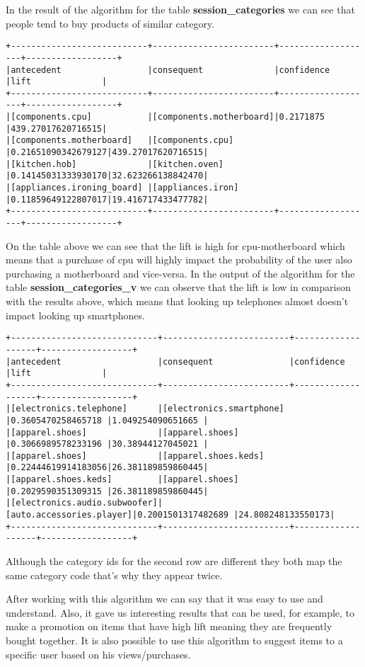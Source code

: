 In the result of the algorithm for the table \textbf{session\_categories} we can see that people tend to buy
products of similar category.

\begin{Verbatim}[commandchars=\\\{\}]
+---------------------------+------------------------+-------------------+------------------+
|antecedent                 |consequent              |confidence         |lift              |
+---------------------------+------------------------+-------------------+------------------+
|[components.cpu]           |[components.motherboard]|0.2171875          |439.27017620716515|
|[components.motherboard]   |[components.cpu]        |0.21651090342679127|439.27017620716515|
|[kitchen.hob]              |[kitchen.oven]          |0.14145031333930170|32.623266138842470|
|[appliances.ironing_board] |[appliances.iron]       |0.11859649122807017|19.416717433477782|
+---------------------------+------------------------+-------------------+------------------+
\end{Verbatim}

On the table above we can see that the lift is high for cpu-motherboard which means that a purchase of cpu will highly impact the probability of the user also purchasing a
motherboard and vice-versa.
In the output of the algorithm for the table \textbf{session\_categories\_v} we can observe that the lift is low in comparison with the results above,
which means that looking up telephones almost doesn't impact looking up smartphones.

\begin{Verbatim}[commandchars=\\\{\}]
+-----------------------------+-------------------------+-------------------+------------------+
|antecedent                   |consequent               |confidence         |lift              |
+-----------------------------+-------------------------+-------------------+------------------+
|[electronics.telephone]      |[electronics.smartphone] |0.3605470258465718 |1.049254090651665 |
|[apparel.shoes]              |[apparel.shoes]          |0.3066989578233196 |30.38944127045021 |
|[apparel.shoes]              |[apparel.shoes.keds]     |0.22444619914183056|26.381189859860445|
|[apparel.shoes.keds]         |[apparel.shoes]          |0.2029590351309315 |26.381189859860445|
|[electronics.audio.subwoofer]|[auto.accessories.player]|0.2001501317482689 |24.808248133550173|
+-----------------------------+-------------------------+-------------------+------------------+
\end{Verbatim}

Although the category ids for the second row are different they both map the same category code that's why they appear twice. 

After working with this algorithm we can say that it was easy to use and understand. Also, it gave us interesting results that can be used, for example, to
make a promotion on items that have high lift meaning they are frequently bought together. It is also possible to use this algorithm to suggest items to a specific user
based on his views/purchases.